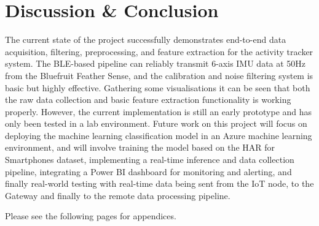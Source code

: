 \documentclass[conference]{IEEEtran}
\begin{document}
\section{Discussion \& Conclusion}
The current state of the project successfully demonstrates end-to-end data acquisition, filtering, preprocessing, and feature extraction for the activity tracker system. The BLE-based pipeline can reliably transmit 6-axis IMU data at 50Hz from the Bluefruit Feather Sense, and the calibration and noise filtering system is basic but highly effective. Gathering some visualisations it can be seen that both the raw data collection and basic feature extraction functionality is working properly. However, the current implementation is still an early prototype and has only been tested in a lab environment. Future work on this project will focus on deploying the machine learning classification model in an Azure machine learning environment, and will involve training the model based on the HAR for Smartphones dataset, implementing a real-time inference and data collection pipeline, integrating a Power BI dashboard for monitoring and alerting, and finally real-world testing with real-time data being sent from the IoT node, to the Gateway and finally to the remote data processing pipeline.




Please see the following pages for appendices.

\onecolumn

\appendices
\end{document}
